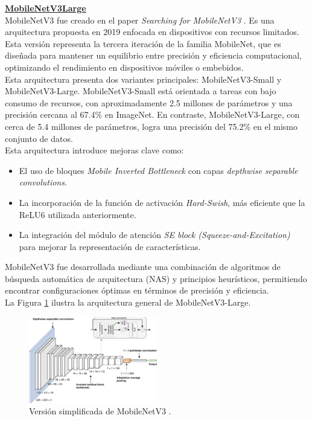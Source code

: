 \textbf{\underline{MobileNetV3Large}} \\

MobileNetV3 fue creado en el paper \textit{Searching for MobileNetV3} 
\cite{Howard2019}. Es una arquitectura propuesta en 2019 enfocada en 
dispositivos con recursos limitados. Esta versión representa la tercera 
iteración de la familia MobileNet, que es diseñada para mantener un 
equilibrio entre precisión y eficiencia computacional, optimizando el 
rendimiento en dispositivos móviles o embebidos.\\

Esta arquitectura presenta dos variantes principales: MobileNetV3-Small 
y MobileNetV3-Large. MobileNetV3-Small está orientada a tareas con bajo 
consumo de recursos, con aproximadamente 2.5 millones de parámetros y 
una precisión cercana al 67.4\% en ImageNet. En contraste, MobileNetV3-Large, 
con cerca de 5.4 millones de parámetros, logra una precisión del 75.2\% en 
el mismo conjunto de datos.\\

Esta arquitectura introduce mejoras clave como:
\begin{itemize}
    \item El uso de bloques \textit{Mobile Inverted Bottleneck} con 
    capas \textit{depthwise separable convolutions}.
    \item La incorporación de la función de activación \textit{Hard-Swish}, 
    más eficiente que la ReLU6 utilizada anteriormente.
    \item La integración del módulo de atención 
    \textit{SE block (Squeeze-and-Excitation)} para mejorar la 
    representación de características.
\end{itemize}

MobileNetV3 fue desarrollada mediante una combinación de algoritmos 
de búsqueda automática de arquitectura (NAS) y principios heurísticos, 
permitiendo encontrar configuraciones óptimas en términos de precisión 
y eficiencia. \\

La Figura \ref{MobileNetV3} ilustra la arquitectura general de MobileNetV3-Large.

\begin{figure}[h!] 
    \includegraphics[width=0.5\textwidth]{images/MobileNetV3.png} 
    \centering  
    \caption[Versión simplificada de MobileNetV3.]
    {Versión simplificada de MobileNetV3 \protect \cite{AbdElaziz2024}.}
    \label{MobileNetV3} 
\end{figure}

